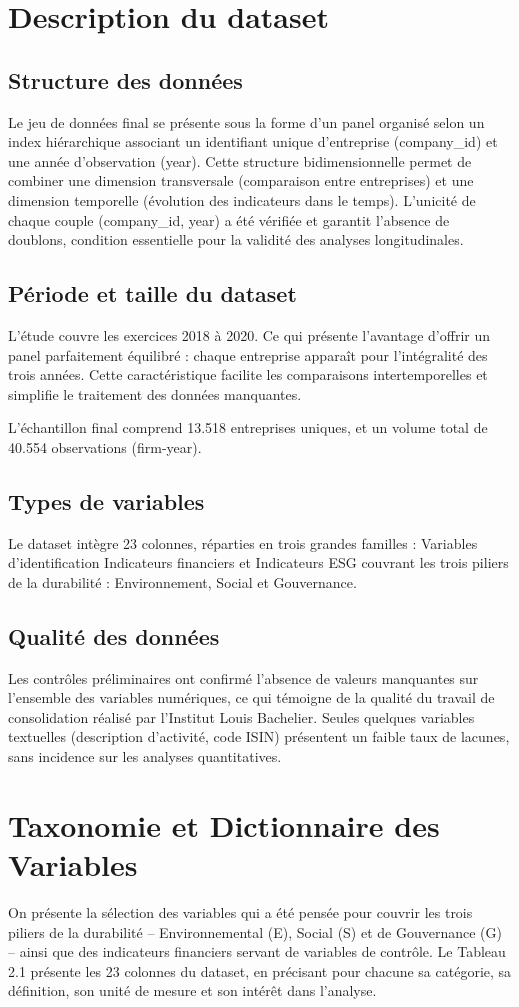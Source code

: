 \section{Description du dataset}
\subsection{Structure des données}
Le jeu de données final se présente sous la forme d’un panel organisé selon un index hiérarchique associant un identifiant unique d’entreprise (company\_id) et une année d’observation (year). Cette structure bidimensionnelle permet de combiner une dimension transversale (comparaison entre entreprises) et une dimension temporelle (évolution des indicateurs dans le temps). L’unicité de chaque couple (company\_id, year) a été vérifiée et garantit l’absence de doublons, condition essentielle pour la validité des analyses longitudinales.
\subsection{Période et taille du dataset}
L’étude couvre les exercices 2018 à 2020. Ce qui présente l’avantage d’offrir un panel parfaitement équilibré : chaque entreprise apparaît pour l’intégralité des trois années. Cette caractéristique facilite les comparaisons intertemporelles et simplifie le traitement des données manquantes.

L’échantillon final comprend 13.518 entreprises uniques, et un volume total de 40.554 observations (firm‑year).
\subsection{Types de variables}
Le dataset intègre 23 colonnes, réparties en trois grandes familles : Variables d’identification Indicateurs financiers et  Indicateurs ESG couvrant les trois piliers de la durabilité : Environnement, Social et Gouvernance.
\subsection{Qualité des données}
Les contrôles préliminaires ont confirmé l’absence de valeurs manquantes sur l’ensemble des variables numériques, ce qui témoigne de la qualité du travail de consolidation réalisé par l’Institut Louis Bachelier. Seules quelques variables textuelles (description d’activité, code ISIN) présentent un faible taux de lacunes, sans incidence sur les analyses quantitatives.
\section{Taxonomie et Dictionnaire des Variables}
On présente la sélection des variables qui a été pensée pour couvrir les trois piliers de la durabilité – Environnemental (E), Social (S) et de Gouvernance (G) – ainsi que des indicateurs financiers servant de variables de contrôle. Le Tableau 2.1 présente les 23 colonnes du dataset, en précisant pour chacune sa catégorie, sa définition, son unité de mesure et son intérêt dans l’analyse.


